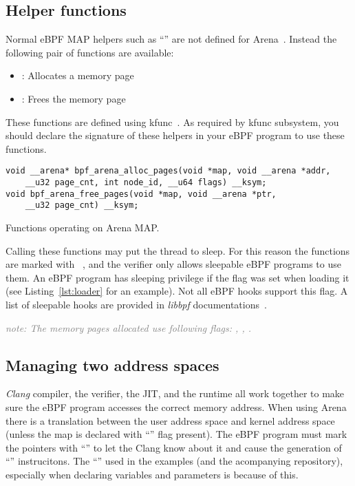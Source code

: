 \documentclass{article}
\begin{document}
\subsection{Helper functions}
Normal eBPF MAP helpers such as ``'' are not
defined for Arena~\cite{arena_source}. Instead the following pair of functions
are available:
\begin{itemize}
    \item {}: Allocates a memory page
    \item {}: Frees the memory page
\end{itemize}

These functions are defined using kfunc~\cite{eunomia_kfunc, ebpf_docs_kfunc}.
As required by kfunc subsystem, you should declare the signature of these
helpers in your eBPF program to use these functions.
\begin{listing}
\begin{verbatim}
void __arena* bpf_arena_alloc_pages(void *map, void __arena *addr,
    __u32 page_cnt, int node_id, __u64 flags) __ksym;
void bpf_arena_free_pages(void *map, void __arena *ptr,
    __u32 page_cnt) __ksym;
\end{verbatim}
\caption{Functions operating on Arena MAP.}
\label{lst:arena_kfuncs}
\end{listing}

Calling these functions may put the thread to sleep. For this reason the
functions are marked with ~\cite{arena_source}, and the
verifier only allows sleepable eBPF programs to use them. An eBPF program has
sleeping privilege if the  flag was set when loading it
(see Listing~\ref{lst:loader} for an example).
Not all eBPF hooks support this flag. A list of sleepable
hooks are provided in \emph{libbpf} documentations~\cite{libbpf_sleepable}.

\textcolor{gray}{\emph{note: The memory pages allocated use following flags:
, , .}}

\subsection{Managing two address spaces}

\emph{Clang} compiler, the verifier, the JIT, and the runtime all work together
to make sure the eBPF program accesses the correct memory address. When using
Arena there is a translation between the user address space and kernel address
space (unless the map is declared with ``'' flag
present). The eBPF program must mark the pointers with
``'' to let the Clang know about it and
cause the generation of ``'' instrucitons. The
``'' used in the examples (and the acompanying repository),
especially when declaring variables and parameters is because of this.
\end{document}
